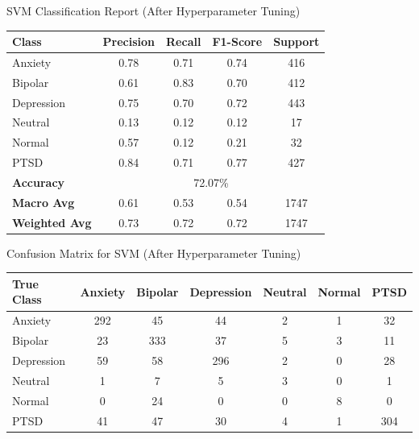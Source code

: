 \begin{center}
\vspace{0.25in}

SVM Classification Report (After Hyperparameter Tuning)
\begin{tabular}{|l|c|c|c|c|}
\hline
\textbf{Class} & \textbf{Precision} & \textbf{Recall} & \textbf{F1-Score} & \textbf{Support} \\ \hline
Anxiety        & 0.78               & 0.71            & 0.74              & 416              \\ \hline
Bipolar        & 0.61               & 0.83            & 0.70              & 412              \\ \hline
Depression     & 0.75               & 0.70            & 0.72              & 443              \\ \hline
Neutral        & 0.13               & 0.12            & 0.12              & 17               \\ \hline
Normal         & 0.57               & 0.12            & 0.21              & 32               \\ \hline
PTSD           & 0.84               & 0.71            & 0.77              & 427              \\ \hline
\textbf{Accuracy} & \multicolumn{4}{|c|}{72.07\%} \\ \hline
\textbf{Macro Avg} & 0.61            & 0.53            & 0.54              & 1747             \\ \hline
\textbf{Weighted Avg} & 0.73         & 0.72            & 0.72              & 1747             \\ \hline
\end{tabular}

\vspace{0.25in}

Confusion Matrix for SVM (After Hyperparameter Tuning)
\begin{tabular}{|l|c|c|c|c|c|c|}
\hline
\textbf{True Class} & \textbf{Anxiety} & \textbf{Bipolar} & \textbf{Depression} & \textbf{Neutral} & \textbf{Normal} & \textbf{PTSD} \\ \hline
Anxiety             & 292              & 45               & 44                  & 2                & 1               & 32            \\ \hline
Bipolar             & 23               & 333              & 37                  & 5                & 3               & 11            \\ \hline
Depression          & 59               & 58               & 296                 & 2                & 0               & 28            \\ \hline
Neutral             & 1                & 7                & 5                   & 3                & 0               & 1             \\ \hline
Normal              & 0                & 24               & 0                   & 0                & 8               & 0             \\ \hline
PTSD                & 41               & 47               & 30                  & 4                & 1               & 304           \\ \hline
\end{tabular}
\end{center}

